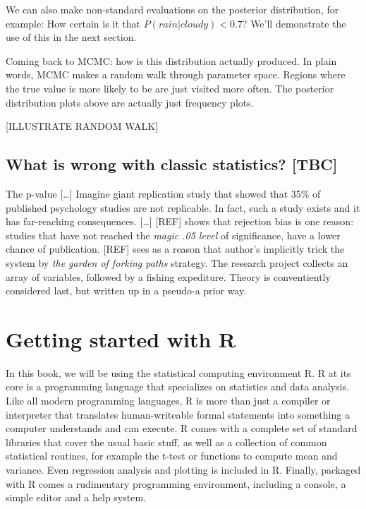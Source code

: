 \documentclass[]{svmono}
\theoremstyle{definition}
\theoremstyle{definition}
\theoremstyle{definition}
\theoremstyle{remark}
\begin{document}
We can also make non-standard evaluations on the posterior distribution,
for example: How certain is it that \(P(rain|cloudy) < 0.7\)? We'll
demonstrate the use of this in the next section.

Coming back to MCMC: how is this distribution actually produced. In
plain words, MCMC makes a random walk through parameter space. Regions
where the true value is more likely to be are just visited more often.
The posterior distribution plots above are actually just frequency
plots.

{[}ILLUSTRATE RANDOM WALK{]}

\section{What is wrong with classic statistics?
{[}TBC{]}}\label{what-is-wrong-with-classic-statistics-tbc}

The p-value {[}\ldots{}{]} Imagine giant replication study that showed
that 35\% of published psychology studies are not replicable. In fact,
such a study exists and it has far-reaching consequences. {[}\ldots{}{]}
{[}REF{]} shows that rejection bias is one reason: studies that have not
reached the \emph{magic .05 level} of significance, have a lower chance
of publication. {[}REF{]} sees as a reason that author's implicitly
trick the system by \emph{the garden of forking paths} strategy. The
research project collects an array of variables, followed by a fishing
expediture. Theory is conventiently considered last, but written up in a
pseudo-a prior way.

\chapter{Getting started with R}\label{getting_started_r}

In this book, we will be using the statistical computing environment R.
R at its core is a programming language that specializes on statistics
and data analysis. Like all modern programming languages, R is more than
just a compiler or interpreter that translates human-writeable formal
statements into something a computer understands and can execute. R
comes with a complete set of standard libraries that cover the usual
basic stuff, as well as a collection of common statistical routines, for
example the t-test or functions to compute mean and variance. Even
regression analysis and plotting is included in R. Finally, packaged
with R comes a rudimentary programming environment, including a console,
a simple editor and a help system.
\end{document}
